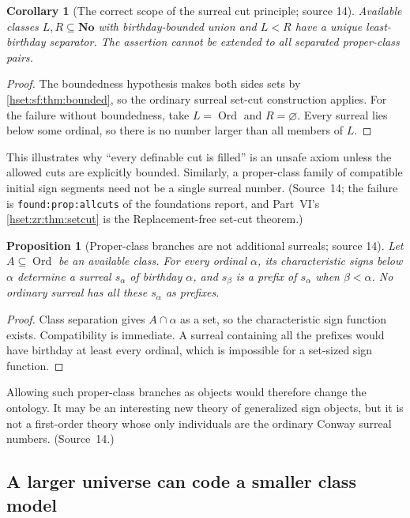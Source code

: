 \documentclass[11pt,letterpaper]{article}
\newtheorem{proposition}[proposition]{Proposition}\aliascntresetthe{proposition}
\newtheorem{corollary}[corollary]{Corollary}\aliascntresetthe{corollary}
\theoremstyle{definition}
\theoremstyle{remark}
\newcommand{\No}{\mathbf{No}}
\newcommand{\Ord}{\operatorname{Ord}}
\newcommand{\lbl}[1]{\nolinkurl{#1}}
\begin{document}
\begin{corollary}[The correct scope of the surreal cut principle; source 14]\label{hset:sf:cor:cuts}
Available classes $L,R\subseteq\No$ with birthday-bounded union and $L<R$ have a
unique least-birthday separator. The assertion cannot be extended to all separated
proper-class pairs.
\end{corollary}
\begin{proof}
The boundedness hypothesis makes both sides sets by \cref{hset:sf:thm:bounded}, so
the ordinary surreal set-cut construction applies. For the failure without
boundedness, take $L=\Ord$ and $R=\varnothing$. Every surreal lies below some
ordinal, so there is no number larger than all members of $L$.
\end{proof}

This illustrates why ``every definable cut is filled'' is an unsafe axiom unless the
allowed cuts are explicitly bounded. Similarly, a proper-class family of compatible
initial sign segments need not be a single surreal number. (Source~14; the failure
is \lbl{found:prop:allcuts} of the foundations report, and Part~VI's
\cref{hset:zr:thm:setcut} is the Replacement-free set-cut theorem.)

\begin{proposition}[Proper-class branches are not additional surreals; source 14]\label{hset:sf:prop:branches}
Let $A\subseteq\Ord$ be an available class. For every ordinal $\alpha$, its
characteristic signs below $\alpha$ determine a surreal $s_\alpha$ of birthday
$\alpha$, and $s_\beta$ is a prefix of $s_\alpha$ when $\beta<\alpha$. No ordinary
surreal has all these $s_\alpha$ as prefixes.
\end{proposition}
\begin{proof}
Class separation gives $A\cap\alpha$ as a set, so the characteristic sign function
exists. Compatibility is immediate. A surreal containing all the prefixes would
have birthday at least every ordinal, which is impossible for a set-sized sign
function.
\end{proof}

Allowing such proper-class branches as objects would therefore change the
ontology. It may be an interesting new theory of generalized sign objects, but it is
not a first-order theory whose only individuals are the ordinary Conway surreal
numbers. (Source~14.)

\subsection{A larger universe can code a smaller class model}
\label{hset:sf:sub:inaccessible}
\end{document}
